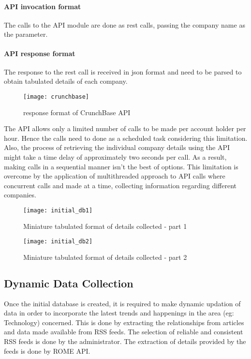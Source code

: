 \paragraph*{API invocation format}
\hfill \break
The calls to the API module are done as rest calls, passing the company name as the parameter.
\paragraph*{API response format}
\hfill \break
The response to the rest call is received in json format and need to be parsed to obtain tabulated details of each company.
\begin{figure}[h]
	\texttt{[image: crunchbase]}
	\centering
	\caption{response format of CrunchBase API}
\end{figure}
\par
The API allows only a limited number of calls to be made per account holder per hour. Hence the calls need to done as a scheduled task considering this limitation. Also, the process of retrieving the individual company details using the API might take a time delay of approximately two seconds per call. As a result, making calls in a sequential manner isn’t the best of options. This limitation is overcome by the application of multithreaded approach to API calls where concurrent calls and made at a time, collecting information regarding different companies.
\begin{figure}[h]
	\texttt{[image: initial\_db1]}
	\centering
	\caption{Miniature tabulated format of details collected - part 1}
\end{figure}
\begin{figure}[h]	
	\texttt{[image: initial\_db2]}
	\centering
	\caption{Miniature tabulated format of details collected - part 2}
\end{figure}

\subsection{Dynamic Data Collection}
\par Once the initial database is created, it is required to make dynamic updation of data in order to incorporate the latest trends and happenings in the area (eg: Technology) concerned. This is done by extracting the relationships from articles and data made available from RSS feeds. The selection of reliable and consistent RSS feeds is done by the administrator. The extraction of details provided by the feeds is done by ROME API.
